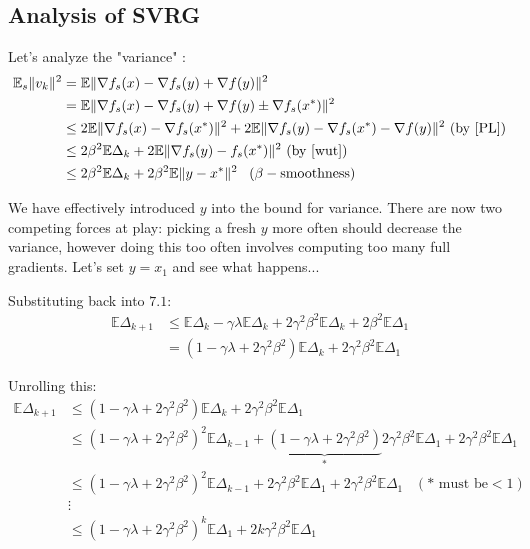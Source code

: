 \documentclass[12pt]{report}
\def \E{\mathbb E}
\begin{document}
\subsection{Analysis of SVRG}
\vspace{.1 in}
Let's analyze the "variance" :
\begin{align*}
\E_s \|v_k \|^2 &= \E \|\nabla f_s(x) - \nabla f_s(y) + \nabla f(y) \|^2 \\
& = \E \| \nabla f_s(x) - \nabla f_s(y) + \nabla f(y) \pm \nabla f_s(x^*) \|^2 \\ 
& \le 2 \E \| \nabla f_s(x) - \nabla f_s(x^*) \|^2 + 2 \E \|\nabla f_s(y) -  \nabla f_s(x^*) - \nabla f(y)\|^2  \text{  (by \ref{PL})} \\ 
& \le 2\beta^2 \E \Delta_k + 2 \E \| \nabla f_s(y) - f_s(x^*)\|^2  \text{  (by \ref{wut})}\\
& \le 2 \beta^2 \E \Delta_k + 2 \beta^2 \E  \| y - x^*\|^2 \;\;\;(\beta- \text{smoothness)}
\end{align*}

We have effectively introduced  $y$ into the bound for variance. There are now two competing forces at play: picking a fresh $y$ more often should decrease the variance, however doing this too often involves computing too many full gradients. Let's set $y =x_1$ and see what happens...

Substituting back into $7.1$:
\begin{align*}
\E \Delta_{k+1} &\le \E \Delta _k - \gamma \lambda \E \Delta_k + 2\gamma^2 \beta^2 \E \Delta_k + 2 \beta^2 \E \Delta_1  \\
& = (1 - \gamma \lambda +2\gamma^2 \beta^2)\E \Delta_k  + 2 \gamma^2\beta^2 \E \Delta_1
\end{align*}

Unrolling this: 
\begin{align*}
\E \Delta_{k+1} & \le (1 - \gamma \lambda +2\gamma^2 \beta^2)\E \Delta_k  + 2 \gamma^2\beta^2 \E \Delta_1 \\
& \le (1 - \gamma \lambda +2\gamma^2 \beta^2)^2 \E\Delta_{k-1} + \underbrace{(1 - \gamma \lambda +2\gamma^2 \beta^2)}_{*}2 \gamma^2\beta^2\E \Delta_1  + 2\gamma^2 \beta^2 \E \Delta_1\\
& \le (1 - \gamma \lambda +2\gamma^2 \beta^2)^2 \E\Delta_{k-1} + 2\gamma^2 \beta^2\E \Delta_1 + 2\gamma^2 \beta^2\E \Delta_1 \;\;\; (*\text{ must be} < 1) \\
& \vdots \\
&  \le (1 - \gamma \lambda +2\gamma^2 \beta^2)^k \E\Delta_{1} + 2k\gamma^2 \beta^2 \E \Delta_1
\end{align*}
\end{document}

